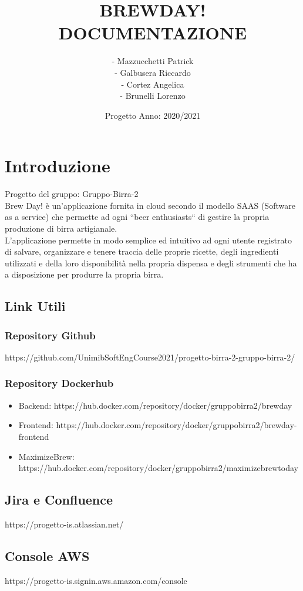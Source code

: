 \documentclass{article}
\title{BREWDAY!\\
DOCUMENTAZIONE}
\author {- Mazzucchetti Patrick\\ 
- Galbusera Riccardo\\
- Cortez Angelica\\
- Brunelli  Lorenzo
}
\date{Progetto Anno: 2020/2021}
\begin{document}
\maketitle
\clearpage
\tableofcontents
\break
\section{Introduzione}
Progetto del gruppo: Gruppo-Birra-2\\
Brew Day! è un’applicazione fornita in cloud secondo il modello SAAS (Software as a service) che permette ad ogni “beer enthusiasts“ di gestire
la propria produzione di birra artigianale.\\
L’applicazione permette in modo semplice ed intuitivo ad ogni utente registrato di salvare, organizzare e tenere traccia delle proprie ricette, degli
ingredienti utilizzati e della loro disponibilità nella propria dispensa e degli strumenti che ha a disposizione per produrre la propria birra.\\
\clearpage
\subsection{Link Utili}
\subsubsection{Repository Github}
https://github.com/UnimibSoftEngCourse2021/progetto-birra-2-gruppo-birra-2/
\subsubsection{Repository Dockerhub}
\begin{itemize}
\item Backend: https://hub.docker.com/repository/docker/gruppobirra2/brewday
\item Frontend: https://hub.docker.com/repository/docker/gruppobirra2/brewday-frontend
\item MaximizeBrew: https://hub.docker.com/repository/docker/gruppobirra2/maximizebrewtoday
\end{itemize}
\subsection{Jira e Confluence}
 https://progetto-is.atlassian.net/
\subsection{Console AWS}
https://progetto-is.signin.aws.amazon.com/console
\end{document}
